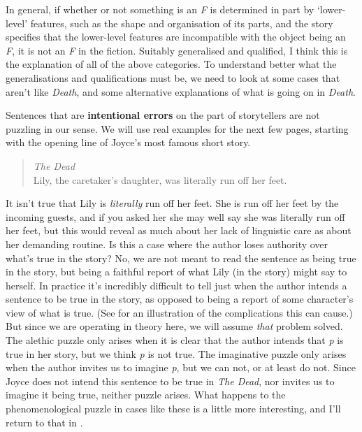 In general, if whether or not something is an \textit{F} is determined in part by `lower-level' features, such as the shape and organisation of its parts, and the story specifies that the lower-level features are incompatible with the object being an \textit{F}, it is not an\textit{ F} in the fiction. Suitably generalised and qualified, I think this is the explanation of all of the above categories. To understand better what the generalisations and qualifications must be, we need to look at some cases that aren't like \textit{Death}, and some alternative explanations of what is going on in \textit{Death}.

Sentences that are \textbf{intentional errors} on the part of storytellers are not puzzling in our sense. We will use real examples for the next few pages, starting with the opening line of Joyce's most famous short story.

\begin{quote}
\textit{The Dead} \\
Lily, the caretaker's daughter, was literally run off her feet.\\ \citep[138]{Joyce1914}
\end{quote}

\noindent It isn't true that Lily is \textit{literally} run off her feet. She is run off her feet by the incoming guests, and if you asked her she may well say she was literally run off her feet, but this would reveal as much about her lack of linguistic care as about her demanding routine. Is this a case where the author loses authority over what's true in the story? No, we are not meant to read the sentence as being true in the story, but being a faithful report of what Lily (in the story) might say to herself. In practice it's incredibly difficult to tell just when the author intends a sentence to be true in the story, as opposed to being a report of some character's view of what is true. (See \citet{Holton1997} for an illustration of the complications this can cause.) But since we are operating in theory here, we will assume \textit{that} problem solved. The alethic puzzle only arises when it is clear that the author intends that \textit{p} is true in her story, but we think \textit{p} is not true. The imaginative puzzle only arises when the author invites us to imagine \textit{p}, but we can not, or at least do not. Since Joyce does not intend this sentence to be true in \textit{The Dead}, nor invites us to imagine it being true, neither puzzle arises. What happens to the phenomenological puzzle in cases like these is a little more interesting, and I'll return to that in .

